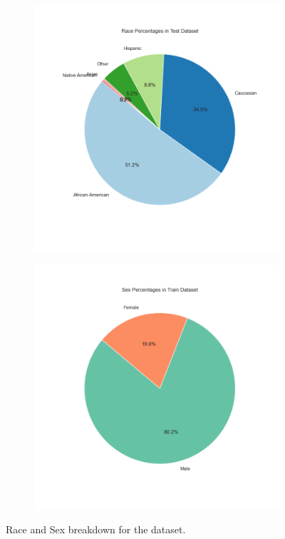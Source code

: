 \begin{figure}[H]
	\centering
	\begin{subfigure}[b]{0.45\linewidth}
		\centering
		\includegraphics[width=\linewidth]{img/race_percentages_pie.png}
	\end{subfigure}
	\hfill
	\begin{subfigure}[b]{0.45\linewidth}
		\centering
		\includegraphics[width=\linewidth]{img/sex_percentages_pie.png}
	\end{subfigure}
	\caption{Race and Sex breakdown for the dataset.}
	\label{fig:race-sex-breakdown}
\end{figure}


